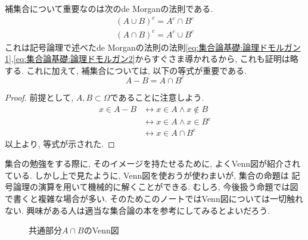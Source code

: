 \documentclass[a4j,dvipdfmx]{jsarticle}
\numberwithin{equation}{section}
\begin{document}
            補集合について重要なのは次のde Morganの法則である.
            \begin{align}
                (A\cup B)^c = A^c \cap B^c \label{eq:集合論基礎:集合ドモルガン1}\\
                (A\cap B)^c = A^c \cup B^c \label{eq:集合論基礎:集合ドモルガン2}
            \end{align}
            これは記号論理で述べたde Morganの法則の法則\eqref{eq:集合論基礎:論理ドモルガン1},\eqref{eq:集合論基礎:論理ドモルガン2}からすぐさま導かれるから, これも証明は略する.
            これに加えて, 補集合については, 以下の等式が重要である.
            \begin{equation}
                A-B = A\cap B^c \label{eq:集合論基礎:差集合を補集合で表す}
            \end{equation}
            \begin{proof}
                前提として, $A,B\subset \varOmega$であることに注意しよう.
                \begin{align*}
                    x\in A-B 
                    &\leftrightarrow x\in A \land x\not\in B\\
                    &\leftrightarrow x\in A \land x\in B^c\\
                    &\leftrightarrow x\in A\cap B^c
                \end{align*}
                以上より, 等式が示された.
            \end{proof}
            集合の勉強をする際に, そのイメージを持たせるために, よくVenn図が紹介されている. しかし上で見たように, Venn図を使おうが使わまいが, 集合の命題は
            記号論理の演算を用いて機械的に解くことができる. むしろ, 今後扱う命題では図で書くと複雑な場合が多い.
            そのためこのノートではVenn図については一切触れない. 興味がある人は適当な集合論の本を参考にしてみるとよいだろう.
            \begin{figure}[h]
                \centering
                \caption{共通部分$A\cap B$のVenn図}
            \end{figure}
        \clearpage
\end{document}
